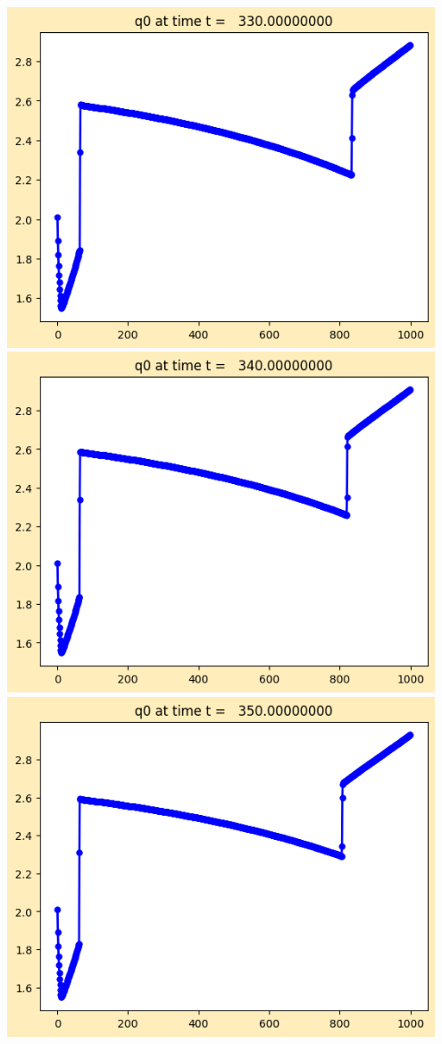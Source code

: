 \documentclass[11pt]{article}
\begin{document}
\vskip 10pt 
\includegraphics[width=0.95\textwidth]{frame0033fig1.png}
\vskip 10pt 
\includegraphics[width=0.95\textwidth]{frame0034fig1.png}
\vskip 10pt 
\includegraphics[width=0.95\textwidth]{frame0035fig1.png}
\end{document}
